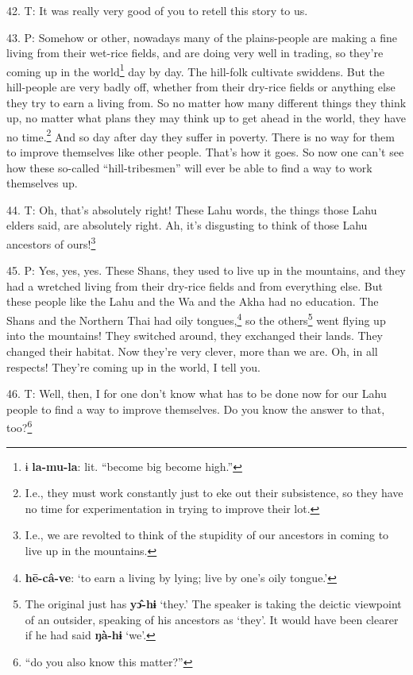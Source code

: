 42. T: It was really very good of you to retell this story to us.

43. P: Somehow or other, nowadays many of the plains-people are making a fine living
from their wet-rice fields, and are doing very well in trading, so they're coming
up in the world\footnote{ɨ \textbf{la-mu-la}: lit. ``become big become high.''} day by day. The hill-folk cultivate swiddens. But the hill-people
are very badly off, whether from their dry-rice fields or anything else they try
to earn a living from. So no matter how many different things they think up, no
matter what plans they may think up to get ahead in the world, they have no time.\footnote{I.e., they must work constantly just to eke out their subsistence, so they have no time for experimentation in trying to improve their lot.}
And so day after day they suffer in poverty. There is no way for them to improve
themselves like other people. That's how it goes. So now one can't see how these
so-called ``hill-tribesmen'' will ever be able to find a way to
work themselves up.

44. T: Oh, that's absolutely right! These Lahu words, the things those Lahu elders
said, are absolutely right. Ah, it's disgusting to think of those Lahu ancestors
of ours!\footnote{I.e., we are revolted to think of the stupidity of our ancestors in coming to live up in the mountains.}

45. P: Yes, yes, yes. These Shans, they used to live up in the mountains, and they
had a wretched living from their dry-rice fields and from everything else. But
these people like the Lahu and the Wa and the Akha had no education. The Shans
and the Northern Thai had oily tongues,\footnote{\textbf{hē-câ-ve}: `to earn a living by lying; live by one's oily tongue.'} so the others\footnote{The original just has \textbf{yɔ̂-hɨ} `they.' The speaker is taking the deictic viewpoint of an outsider, speaking of his ancestors as `they'. It would have been clearer if he had said \textbf{ŋà-hɨ} `we'.} went flying up into
the mountains! They switched around, they exchanged their lands. They changed their
habitat. Now they're very clever, more than we are. Oh, in all respects! They're
coming up in the world, I tell you.

46. T: Well, then, I for one don't know what has to be done now for our Lahu people
to find a way to improve themselves. Do you know the answer to that, too?\footnote{``do you also know this matter?''}

